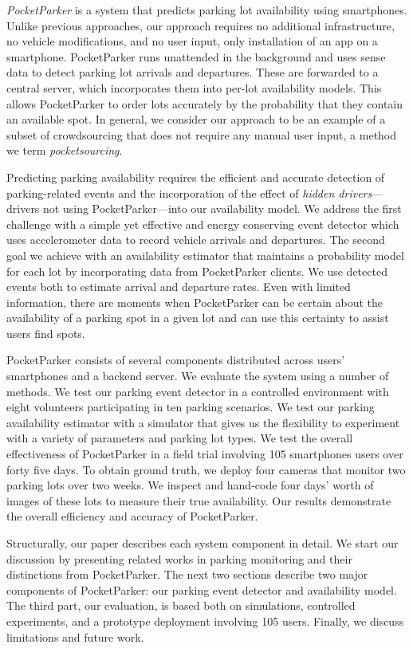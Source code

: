 \textit{PocketParker} is a system that predicts parking lot availability using
smartphones. Unlike previous approaches, our approach requires no additional
infrastructure, no vehicle modifications, and no user input, only installation
of an app on a smartphone.  PocketParker runs unattended in the background and
uses sense data to detect parking lot arrivals and departures.  These are
forwarded to a central server, which incorporates them into per-lot
availability models.  This allows PocketParker to order lots accurately by the
probability that they contain an available spot.  In general, we consider our
approach to be an example of a subset of crowdsourcing that does not require
any manual user input, a method we term \textit{pocketsourcing}.

Predicting parking availability requires the efficient and accurate detection
of parking-related events and the incorporation of the effect of
\textit{hidden drivers}---drivers not using PocketParker---into our
availability model. We address the first challenge with a simple yet effective
and energy conserving event detector which uses accelerometer data to record
vehicle arrivals and departures.  The second goal we achieve with an
availability estimator that maintains a probability model for each lot by
incorporating data from PocketParker clients. We use detected events both to
estimate arrival and departure rates.  Even with limited information, there
are moments when PocketParker can be certain about the availability of a
parking spot in a given lot and can use this certainty to assist users find
spots.

PocketParker consists of several components distributed across users'
smartphones and a backend server.  We evaluate the system using a number of
methods.  We test our parking event detector in a controlled environment
with eight volunteers participating in ten parking scenarios. We test our
parking availability estimator with a simulator that gives us the flexibility
to experiment with a variety of parameters and parking lot types.  We test the
overall effectiveness of PocketParker in a field trial involving 105
smartphones users over forty five days. To obtain ground truth, we deploy four
cameras that monitor two parking lots over two weeks. We inspect and hand-code
four days' worth of images of these lots to measure their true availability.
Our results demonstrate the overall efficiency and accuracy of PocketParker.

Structurally, our paper describes each system component in detail. We start
our discussion by presenting related works in parking monitoring and their
distinctions from PocketParker.  The next two sections describe two major
components of PocketParker: our parking event detector and availability model.
The third part, our evaluation, is based both on simulations, controlled
experiments, and a prototype deployment involving 105 users.  Finally, we
discuss limitations and future work.

